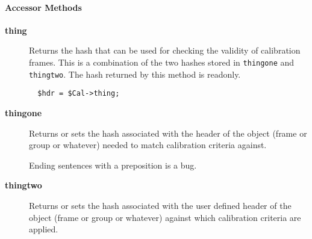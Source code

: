 \paragraph*{Accessor Methods\label{ORAC::Calib_Accessor_Methods}}
\begin{description}

\item[{\textbf{thing}}] \mbox{}

Returns the hash that can be used for checking the validity of
calibration frames. This is a combination of the two hashes
stored in \texttt{thingone} and \texttt{thingtwo}. The hash returned
by this method is readonly.

\begin{verbatim}
  $hdr = $Cal->thing;
\end{verbatim}

\item[{\textbf{thingone}}] \mbox{}

Returns or sets the hash associated with the header of the object
(frame or group or whatever) needed to match calibration criteria
against.



Ending sentences with a preposition is a bug.


\item[{\textbf{thingtwo}}] \mbox{}

Returns or sets the hash associated with the user defined header of
the object (frame or group or whatever) against which calibration
criteria are applied.

\end{description}
